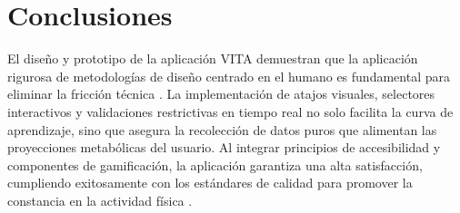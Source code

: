 \section{Conclusiones}

El diseño y prototipo de la aplicación VITA demuestran que la aplicación rigurosa de metodologías de diseño centrado en el humano es fundamental para eliminar la fricción técnica \parencite{diaz2013diseno,iso9241_210}.
La implementación de atajos visuales, selectores interactivos y validaciones restrictivas en tiempo real no solo facilita la curva de aprendizaje, sino que asegura la recolección de datos puros que alimentan las proyecciones metabólicas del usuario. Al integrar principios de accesibilidad y componentes de gamificación, la aplicación garantiza una alta satisfacción, cumpliendo exitosamente con los estándares de calidad para promover la constancia en la actividad física \parencite{iso9241_11,mejia2024calidad}.